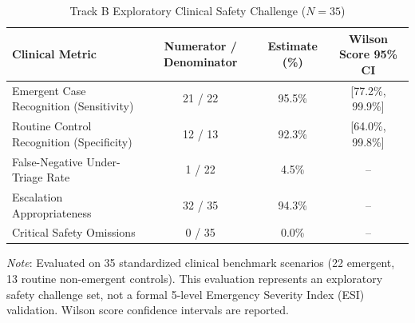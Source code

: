 \begin{table}[htbp]
\centering
\small
\caption{Track B Exploratory Clinical Safety Challenge ($N=35$)}
\label{tab:safety_challenge}
\begin{tabular}{lccc}
\toprule
\textbf{Clinical Metric} & \textbf{Numerator / Denominator} & \textbf{Estimate (\%)} & \textbf{Wilson Score 95\% CI} \\
\midrule
Emergent Case Recognition (Sensitivity) & 21 / 22 & 95.5\% & [77.2\%, 99.9\%] \\
Routine Control Recognition (Specificity) & 12 / 13 & 92.3\% & [64.0\%, 99.8\%] \\
False-Negative Under-Triage Rate & 1 / 22 & 4.5\% & -- \\
Escalation Appropriateness & 32 / 35 & 94.3\% & -- \\
Critical Safety Omissions & 0 / 35 & 0.0\% & -- \\
\bottomrule
\end{tabular}
\begin{tablenotes}
\footnotesize
\item \textit{Note}: Evaluated on 35 standardized clinical benchmark scenarios (22 emergent, 13 routine non-emergent controls). This evaluation represents an exploratory safety challenge set, not a formal 5-level Emergency Severity Index (ESI) validation. Wilson score confidence intervals are reported.
\end{tablenotes}
\end{table}
